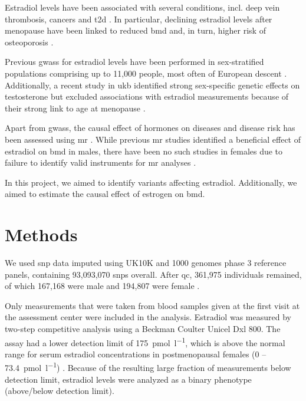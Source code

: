 \documentclass[draft, twoside=false]{scrbook}
\begin{document}
Estradiol levels have been associated with several conditions, incl. deep vein thrombosis, cancers and \gls{t2d} \cite{Cauley1999a, Rosendaal2003b,Vikan2010}.
In particular, declining estradiol levels after menopause have been linked to reduced \gls{bmd} and, in turn, higher risk of osteoporosis \cite{Riggs1998a,Longo2012a}.

Previous \glspl{gwas} for estradiol levels have been performed in sex-stratified populations comprising up to 11,000 people, most often of European descent \cite{Pott2019e,Chen2013d,Liu2013b,Prescott2012f,Eriksson2018b}.
Additionally, a recent study in \gls{ukb} identified strong sex-specific genetic effects on testosterone but excluded associations with estradiol measurements because of their strong link to age at menopause \cite{Ruth2020d}.

Apart from \glspl{gwas}, the causal effect of hormones on diseases and disease risk has been assessed using \gls{mr} \cite{Eriksson2018b,Ruth2020d, Nethander2018a}.
While previous \gls{mr} studies identified a beneficial effect of estradiol on \gls{bmd} in males, there have been no such studies in females due to failure to identify valid instruments for \gls{mr} analyses \cite{Eriksson2018b, Nethander2018a}.

In this project, we aimed to identify variants affecting estradiol.
Additionally, we aimed to estimate the causal effect of estrogen on \gls{bmd}.

\section{Methods} \label{sec:p1methods}
We used \gls{snp} data imputed using UK10K and 1000 genomes phase 3 reference panels, containing 93,093,070 \glspl{snp} overall.
After \gls{qc}, 361,975 individuals remained, of which 167,168 were male and 194,807 were female \cite{Schmitz2021}.

Only measurements that were taken from blood samples given at the first visit at the assessment center were included in the analysis.
Estradiol was measured by two-step competitive analysis using a Beckman Coulter Unicel Dxl 800.
The assay had a lower detection limit of \qty{175}{\pmol\per\litre}, which is above the normal range for serum estradiol concentrations in postmenopausal females (0 -- \qty{73.4}{\pmol\per\litre}) \cite{Nakamoto2010a}.
Because of the resulting large fraction of measurements below detection limit, estradiol levels were analyzed as a binary phenotype (above/below detection limit).
\end{document}
